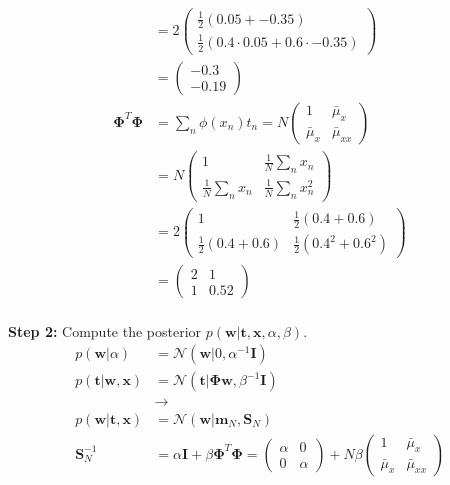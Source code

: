\documentclass[a4paper,10pt]{article}
\numberwithin{equation}{section} %
\numberwithin{figure}{section} %
\numberwithin{table}{section} %
\theoremstyle{mytheor}
\begin{document}
\begin{enumerate}
\begin{align}
		& = 2\begin{pmatrix} \frac{1}{2} (0.05 + -0.35) \\ \frac{1}{2} (0.4\cdot 0.05 + 0.6 \cdot -0.35)\end{pmatrix} \\
		& = \begin{pmatrix} -0.3 \\  -0.19 \end{pmatrix}
		\end{align}
		\begin{align}
		\boldsymbol{\Phi}^T\boldsymbol{\Phi} &= \sum_n \phi(x_n)t_n = N\begin{pmatrix} 1 & \bar{\mu}_x \\ \bar{\mu}_x & \bar{\mu}_{xx} \end{pmatrix}\\
		& = N\begin{pmatrix} 1 & \frac{1}{N} \sum_n x_n \\ \frac{1}{N} \sum_n x_n & \frac{1}{N} \sum_n x_n^2 \end{pmatrix}\\
		& = 2\begin{pmatrix} 1 & \frac{1}{2} (0.4 + 0.6) \\ \frac{1}{2} (0.4 + 0.6) & \frac{1}{2} (0.4^2 + 0.6^2) \end{pmatrix}\\
		& = \begin{pmatrix} 2 & 1 \\ 1 & 0.52 \end{pmatrix}
		\end{align}\\
		\textbf{Step 2:} Compute the posterior $p(\boldsymbol{w} | \boldsymbol{t}, \boldsymbol{x}, \alpha, \beta)$. 
		\begin{align}
		p(\boldsymbol{w} | \alpha) &= \mathcal{N}(\boldsymbol{w} | 0, \alpha^{-1}\boldsymbol{I})\\
		p(\boldsymbol{t} | \boldsymbol{w}, \boldsymbol{x}) &= \mathcal{N}(\boldsymbol{t} | \boldsymbol{\Phi}\boldsymbol{w}, \beta^{-1}\boldsymbol{I})\\
		&\rightarrow\\
		p(\boldsymbol{w} | \boldsymbol{t}, \boldsymbol{x}) &= \mathcal{N}(\boldsymbol{w} | \boldsymbol{m}_N, \boldsymbol{S}_N)\\	
		\boldsymbol{S}_N^{-1} &= \alpha \boldsymbol{I} + \beta \boldsymbol{\Phi}^T\boldsymbol{\Phi} = \begin{pmatrix} \alpha & 0 \\ 0 & \alpha \end{pmatrix} + N\beta \begin{pmatrix} 1 & \bar{\mu}_x \\ \bar{\mu}_x & \bar{\mu}_{xx} \end{pmatrix}\\

\end{align}
\end{enumerate}
\end{document}
